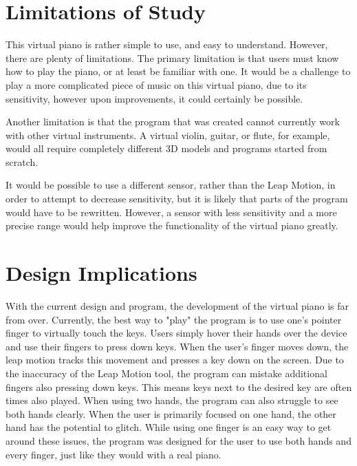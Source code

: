 \documentclass[conference,compsoc]{IEEEtran}
\begin{document}
\section{Limitations of Study}
This virtual piano is rather simple to use, and easy to understand. However, there are plenty of limitations. The primary limitation is that users must know how to play the piano, or at least be familiar with one. It would be a challenge to play a more complicated piece of music on this virtual piano, due to its sensitivity, however upon improvements, it could certainly be possible. 

Another limitation is that the program that was created cannot currently work with other virtual instruments. A virtual violin, guitar, or flute, for example, would all require completely different 3D models and programs started from scratch.

It would be possible to use a different sensor, rather than the Leap Motion, in order to attempt to decrease sensitivity, but it is likely that parts of the program would have to be rewritten. However, a sensor with less sensitivity and a more precise range would help improve the functionality of the virtual piano greatly.


\section{Design Implications}
With the current design and program, the development of the virtual piano is far from over. Currently, the best way to "play" the program is to use one's pointer finger to virtually touch the keys. Users simply hover their hands over the device and use their fingers to press down keys. When the user's finger moves down, the leap motion tracks this movement and presses a key down on the screen. Due to the inaccuracy of the Leap Motion tool, the program can mistake additional fingers also pressing down keys. This means keys next to the desired key are often times also played. When using two hands, the program can also struggle to see both hands clearly. When the user is primarily focused on one hand, the other hand has the potential to glitch. While using one finger is an easy way to get around these issues, the program was designed for the user to use both hands and every finger, just like they would with a real piano.
\end{document}
